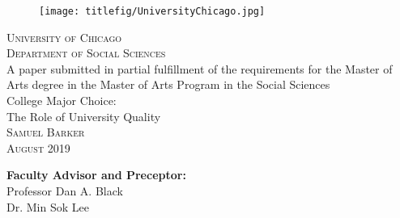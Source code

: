 

\begin{titlepage}
\begin{figure}[t]
    \centering\texttt{[image: titlefig/UniversityChicago.jpg]}
\end{figure}
\begin{center}
    \textsc{ \LARGE{University of Chicago \\}}
	\textsc{ \LARGE{Department of Social Sciences\\ \bigskip}}
	\textnormal{ \large{A paper submitted in partial fulfillment of the requirements for the Master of Arts degree in the Master of Arts Program in the Social Sciences\\}}
	\vspace{30mm}
	\fontsize{10mm}{7mm}\selectfont
    \textup{College Major Choice:\\ The Role of University Quality}\\
    \bigskip
    \medskip
    \textsc{ \LARGE{Samuel Barker}}\\
    \medskip
    \textsc{\LARGE{August 2019}}
\end{center}

\vspace{30mm}

\begin{minipage}[t]{0.7\textwidth}
	\textnormal{\large{\bf Faculty Advisor and Preceptor:\\}}
	{\large Professor Dan A. Black\\ Dr. Min Sok Lee}
\end{minipage}\hfill


\end{titlepage}

\newpage
\thispagestyle{empty}
\setcounter{tocdepth}{2} %
\tableofcontents %
\listoffigures %
\listoftables %

